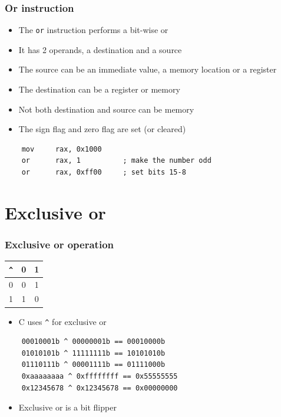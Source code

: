 \documentclass{beamer}
\begin{document}
\begin{frame}[fragile]
    \frametitle{Or instruction}
   \begin{itemize}
        \item The {\tt or} instruction performs a bit-wise or
        \item It has 2 operands, a destination and a source
        \item The source can be an immediate value, a memory location
              or a register
        \item The destination can be a register or memory
        \item Not both destination and source can be memory
        \item The sign flag and zero flag are set (or cleared)
    \end{itemize}
\begin{verbatim}
    mov     rax, 0x1000
    or      rax, 1          ; make the number odd
    or      rax, 0xff00     ; set bits 15-8
\end{verbatim}
\end{frame}

\section{Exclusive or}

\begin{frame}[fragile]
    \frametitle{Exclusive or operation}
\begin{center}
\begin{tabular}{c|cc}
{\tt \^{}} & 0 & 1 \\
\hline
0       & 0 & 1 \\
1       & 1 & 0 \\
\end{tabular}
\end{center}
    \begin{itemize}
        \item C uses {\tt \^{}} for exclusive or
    \end{itemize}
\begin{verbatim}
    00010001b ^ 00000001b == 00010000b
    01010101b ^ 11111111b == 10101010b
    01110111b ^ 00001111b == 01111000b
    0xaaaaaaaa ^ 0xffffffff == 0x55555555
    0x12345678 ^ 0x12345678 == 0x00000000
\end{verbatim}
    \begin{itemize}
        \item Exclusive or is a bit flipper
    \end{itemize}
\end{frame}
\end{document}
